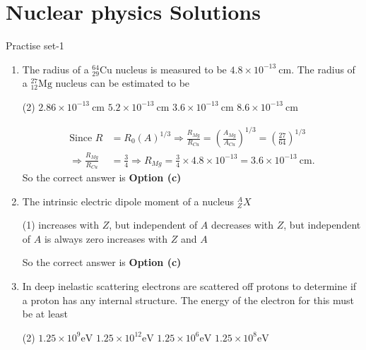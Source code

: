 \chapter{Nuclear physics Solutions}
\begin{abox}
	Practise set-1
\end{abox}
\begin{enumerate}
	\item  The radius of a ${ }_{29}^{64} \mathrm{Cu}$ nucleus is measured to be $4.8 \times 10^{-13} \mathrm{~cm}$. The radius of a ${ }_{12}^{27} \mathrm{Mg}$ nucleus can be estimated to be
	\begin{tasks}(2)
		\task[\textbf{a.}]$2.86 \times 10^{-13} \mathrm{~cm}$
		\task[\textbf{b.}]$5.2 \times 10^{-13} \mathrm{~cm}$
		\task[\textbf{c.}] $3.6 \times 10^{-13} \mathrm{~cm}$
		\task[\textbf{d.}] $8.6 \times 10^{-13} \mathrm{~cm}$
	\end{tasks}
\begin{answer}
	\begin{align*}
\text{Since }R&=R_0(A)^{1 / 3} \Rightarrow \frac{R_{M g}}{R_{C u}}=\left(\frac{A_{M g}}{A_{C u}}\right)^{1 / 3}=\left(\frac{27}{64}\right)^{1 / 3}\\
	\Rightarrow \frac{R_{M g}}{R_{C u}}&=\frac{3}{4} \Rightarrow R_{M g}=\frac{3}{4} \times 4.8 \times 10^{-13}=3.6 \times 10^{-13} \mathrm{~cm} .
	\end{align*}
	So the correct answer is \textbf{Option (c)}
\end{answer}
	\item  The intrinsic electric dipole moment of a nucleus ${ }_Z^A X$
	\begin{tasks}(1)
		\task[\textbf{a.}]increases with $Z$, but independent of $A$
		\task[\textbf{b.}]decreases with $Z$, but independent of $A$
		\task[\textbf{c.}] is always zero
		\task[\textbf{d.}] increases with $Z$ and $A$
	\end{tasks}
\begin{answer}
So the correct answer is \textbf{Option (c)}
\end{answer}
	\item  In deep inelastic scattering electrons are scattered off protons to determine if a proton has any internal structure. The energy of the electron for this must be at least
	\begin{tasks}(2)
		\task[\textbf{a.}]$1.25 \times 10^9 \mathrm{eV}$
		\task[\textbf{b.}]$1.25 \times 10^{12} \mathrm{eV}$
		\task[\textbf{c.}] $1.25 \times 10^6 \mathrm{eV}$
		\task[\textbf{d.}] $1.25 \times 10^8 \mathrm{eV}$

\end{tasks}
\end{enumerate}
